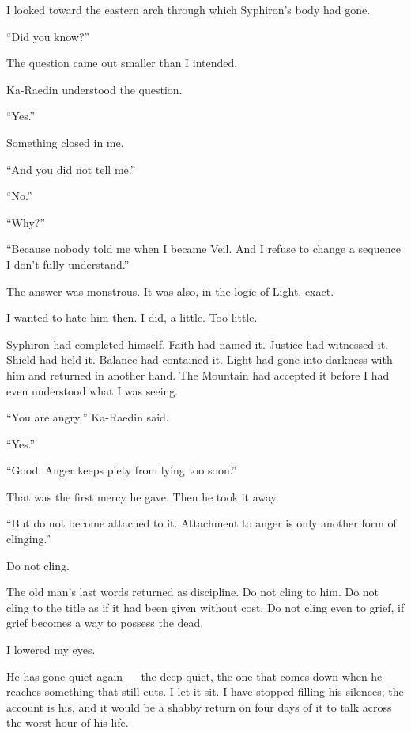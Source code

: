 I looked toward the eastern arch through which Syphiron's body had gone.\par
``Did you know?''\par
The question came out smaller than I intended.\par
Ka-Raedin understood the question.\par
``Yes.''\par
Something closed in me.\par
``And you did not tell me.''\par
``No.''\par
``Why?''\par
``Because nobody told me when I became Veil. And I refuse to change a sequence I don't fully understand.''\par
The answer was monstrous.
It was also, in the logic of Light, exact.\par
I wanted to hate him then.
I did, a little.
Too little.\par
Syphiron had completed himself.
Faith had named it.
Justice had witnessed it.
Shield had held it.
Balance had contained it.
Light had gone into darkness with him and returned in another hand.
The Mountain had accepted it before I had even understood what I was seeing.\par
``You are angry,'' Ka-Raedin said.\par
``Yes.''\par
``Good.
Anger keeps piety from lying too soon.''\par
That was the first mercy he gave.
Then he took it away.\par
``But do not become attached to it.
Attachment to anger is only another form of clinging.''\par
Do not cling.\par
The old man's last words returned as discipline.
Do not cling to him.
Do not cling to the title as if it had been given without cost.
Do not cling even to grief, if grief becomes a way to possess the dead.\par
I lowered my eyes.\par

\ornament

He has gone quiet again --- the deep quiet, the one that comes down when he reaches something that still cuts. I let it sit. I have stopped filling his silences; the account is his, and it would be a shabby return on four days of it to talk across the worst hour of his life.\par

